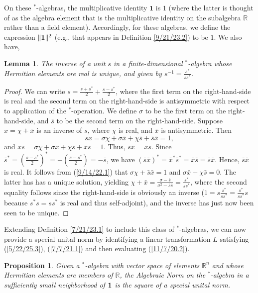 \documentclass{amsart}
\newtheorem{proposition}[theorem]{Proposition}
\newtheorem{lemma}[theorem]{Lemma}
\theoremstyle{definition}
\numberwithin{theorem}{section}
\numberwithin{equation}{section}
\begin{document}
On these $^*$-algebras, the multiplicative identity $\mathbf{1}$ is $1$ (where the latter is thought of as the algebra element that is the multiplicative identity on the subalgebra $\mathbb{R}$ rather than a field element).  Accordingly, for these algebras, we define the expression $\|{\bf 1}\|^2$ (e.g., that appears in Definition \ref{9/21/23.2}) to be $1$.  We also have,

\begin{lemma}\label{9/14/22.2} The inverse of a unit $s$ in a finite-dimensional $^*$-algebra whose Hermitian elements are real is unique, and given by $s^{-1}=\frac{s^*}{ss^*}$.\end{lemma}

\begin{proof} 
We can write $s=\frac{s+s^*}{2} +\frac{s-s^*}{2}$, where the first  term on the right-hand-side is real and the second term on the right-hand-side is antisymmetric with respect to application of the $^*$-operation.  We define $\sigma$ to be the first term on the right-hand-side, and $\bar{s}$ to be the second term on the right-hand-side.  Suppose $x = \chi + \bar{x}$ is an inverse of $s$, where $\chi$ is real, and $\bar{x}$ is antisymmetric. Then \begin{equation}\label{9/14/22.1} sx = \sigma\chi + \sigma\bar{x}+\chi\bar{s} + \bar{s}\bar{x} = 1,\end{equation} and $xs = \sigma\chi + \sigma\bar{x}+\chi\bar{s} + \bar{x}\bar{s} = 1$.  Thus, $\bar{s}\bar{x} = \bar{x}\bar{s}$.  Since $\bar{s}^* = (\frac{s-s^*}{2})^* = -(\frac{s-s^*}{2}) = -\bar{s}$, we have $(\bar{s}\bar{x})^* = \bar{x}^*\bar{s}^* = \bar{x}\bar{s} = \bar{s}\bar{x}$.  Hence, $\bar{s}\bar{x}$ is real.  It follows from (\ref{9/14/22.1}) that $\sigma\chi+\bar{s}\bar{x} =1$ and $\sigma\bar{x}+\chi\bar{s} = 0$.  The latter has has a unique solution, yielding $\chi+\bar{x} = \frac{\sigma-\bar{s}}{\sigma^2-\bar{s}\bar{s}} = \frac{s^*}{ss^*}$, where the second equality follows since the right-hand-side is obviously an inverse ($1=s\frac{s^*}{ss^*} = \frac{s^*}{ss^*}s$ because $s^*s=ss^*$ is real and thus self-adjoint), and the inverse has just now been seen to be unique.
\end{proof}

Extending Definition \ref{7/21/23.1} to include this class of $^*$-algebras, we can now provide a special unital norm  by identifying a linear transformation $L$ satisfying (\ref{5/22/25.3}), (\ref{7/7/21.1}) and then evaluating (\ref{11/7/20.2}).  
 
 \begin{proposition}\label{1/11/22.1} Given a $^*$-algebra with vector space of elements $\mathbb{R}^n$ and whose Hermitian elements are members of $\mathbb{R}$, the Algebraic Norm on the $^*$-algebra in a sufficiently small neighborhood of ${\bf 1}$ is the square of a special unital norm. \end{proposition}
\end{document}
